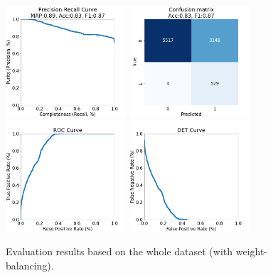 \documentclass[DM,authoryear,toc]{lsstdoc}
\begin{document}
\begin{figure}[h]
  \centering
  \includegraphics[width=0.4\textwidth]{precrec_13-resnet50-FullAugmentation-scratch-B64__0255000__npy_data_0.1.2-0sigma_256by256__posw_20.png}
  \includegraphics[width=0.4\textwidth]{confmat_13-resnet50-FullAugmentation-scratch-B64__0255000__npy_data_0.1.2-0sigma_256by256__posw_20.png}
  \includegraphics[width=0.4\textwidth]{roc_13-resnet50-FullAugmentation-scratch-B64__0255000__npy_data_0.1.2-0sigma_256by256__posw_20.png}
  \includegraphics[width=0.4\textwidth]{det_13-resnet50-FullAugmentation-scratch-B64__0255000__npy_data_0.1.2-0sigma_256by256__posw_20.png}
  \caption{Evaluation results based on the whole dataset (with weight-balancing).}
  \label{fig:tract_templates}
\end{figure}
\end{document}
